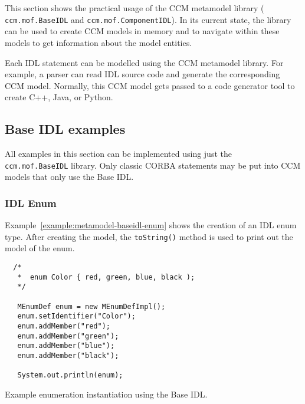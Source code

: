 This section shows the practical usage of the CCM metamodel library ({\tt
ccm.mof.BaseIDL} and {\tt ccm.mof.ComponentIDL}). In its current state, the
library can be used to create CCM models in memory and to navigate within these
models to get information about the model entities.

Each IDL statement can be modelled using the CCM metamodel library. For example,
a parser can read IDL source code and generate the corresponding CCM model.
Normally, this CCM model gets passed to a code generator tool to create C++,
Java, or Python.

\subsection{Base IDL examples}

All examples in this section can be implemented using just the {\tt
ccm.mof.BaseIDL} library. Only classic CORBA statements may be put into CCM
models that only use the Base IDL.

\subsubsection{IDL Enum}

Example~\ref{example:metamodel-baseidl-enum} shows the creation of an IDL enum
type. After creating the model, the {\tt toString()} method is used to print out
the model of the enum.

\begin{Example}
\begin{minifbox}
\begin{verbatim}
  /*
   *  enum Color { red, green, blue, black );
   */

   MEnumDef enum = new MEnumDefImpl();
   enum.setIdentifier("Color");
   enum.addMember("red");
   enum.addMember("green");
   enum.addMember("blue");
   enum.addMember("black");

   System.out.println(enum);
\end{verbatim}
\end{minifbox}
\caption{Example enumeration instantiation using the Base IDL.}
\label{example:metamodel-baseidl-enum}
\end{Example}

